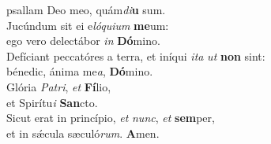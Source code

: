 \evenverse psallam Deo meo, quám\textit{di}\textbf{u} sum.\\
\oddverse Jucúndum sit ei e\textit{ló}\textit{qui}\textit{um} \textbf{me}um:~\*\\
\oddverse ego vero delectábor \textit{in} \textbf{Dó}mino.\\
\evenverse Defíciant peccatóres a terra, et iníqui \textit{i}\textit{ta} \textit{ut} \textbf{non} sint:~\*\\
\evenverse bénedic, ánima me\textit{a}, \textbf{Dó}mino.\\
\oddverse Glória \textit{Pa}\textit{tri}, \textit{et} \textbf{Fí}lio,~\*\\
\oddverse et Spirítu\textit{i} \textbf{San}cto.\\
\evenverse Sicut erat in princípio, \textit{et} \textit{nunc}, \textit{et} \textbf{sem}per,~\*\\
\evenverse et in sǽcula sæculó\textit{rum}. \textbf{A}men.\\
